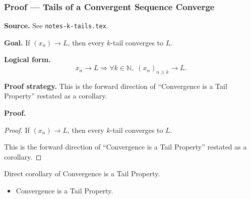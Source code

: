 
\clearpage
{}
\hypertarget{proof-RA-ABB-C-tails-converge}{}

\subsubsection[Tails of a Convergent Sequence Converge]{Proof --- Tails of a Convergent Sequence Converge}

\bigskip

\noindent
\textbf{Source.}
See \texttt{notes-k-tails.tex}.

\vspace{0.75em}

\noindent
\textbf{Goal.}
If $(x_n) \to L$, then every $k$-tail converges to $L$.

\vspace{0.75em}

\noindent
\textbf{Logical form.}
\[
  x_n \to L \Rightarrow \forall k \in \mathbb{N},\; (x_n)_{n \ge k} \to L.
\]

\vspace{0.75em}

\noindent
\textbf{Proof strategy.}
This is the forward direction of ``Convergence is a Tail Property'' restated as a corollary.

\vspace{0.75em}

\noindent
\textbf{Proof.}
\begin{proof}
\Claim If $(x_n) \to L$, then every $k$-tail converges to $L$.

\Given 

\Goal 

\Strategy This is the forward direction of ``Convergence is a Tail Property'' restated as a corollary.

\medskip


\end{proof}

\begin{remark*}
Direct corollary of Convergence is a Tail Property.
\end{remark*}

\begin{remark*}[Dependencies]
\begin{itemize}
  \item Convergence is a Tail Property.
\end{itemize}
\end{remark*}
